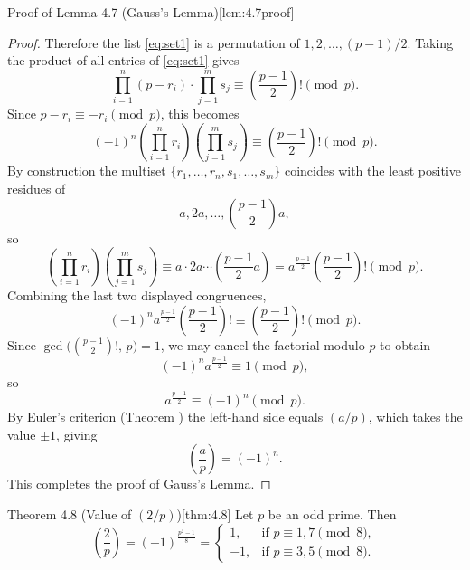 \documentclass[10pt]{article}
\theoremstyle{definition}
\theoremstyle{plain}
\numberwithin{equation}{section}
\begin{document}
\begin{define}{Proof of Lemma 4.7 (Gauss's Lemma)}[lem:4.7proof]
\begin{proof}
Therefore the list \eqref{eq:set1} is a permutation of $1,2,\dots,(p-1)/2$. Taking the product of all entries of \eqref{eq:set1} gives
\[
\prod_{i=1}^n (p-r_i)\cdot\prod_{j=1}^m s_j \equiv \left(\frac{p-1}{2}\right)! \pmod p.
\]
Since $p-r_i \equiv -r_i\pmod p$, this becomes
\[
(-1)^n \left(\prod_{i=1}^n r_i\right)\left(\prod_{j=1}^m s_j\right) \equiv \left(\frac{p-1}{2}\right)! \pmod p.
\]
By construction the multiset $\{r_1,\dots,r_n,s_1,\dots,s_m\}$ coincides with the least positive residues of
\[
a,2a,\dots,\left(\frac{p-1}{2}\right)a,
\]
so
\[
\left(\prod_{i=1}^n r_i\right)\left(\prod_{j=1}^m s_j\right)\equiv a\cdot 2a\cdots\left(\frac{p-1}{2}a\right)
= a^{\frac{p-1}{2}}\left(\frac{p-1}{2}\right)! \pmod p.
\]
Combining the last two displayed congruences,
\[
(-1)^n a^{\frac{p-1}{2}}\left(\frac{p-1}{2}\right)! \equiv \left(\frac{p-1}{2}\right)! \pmod p.
\]
Since $\gcd\!\big((\tfrac{p-1}{2})!,\,p\big)=1$, we may cancel the factorial modulo $p$ to obtain
\[
(-1)^n a^{\frac{p-1}{2}} \equiv 1 \pmod p,
\]
so
\[
a^{\frac{p-1}{2}} \equiv (-1)^n \pmod p.
\]
By Euler's criterion (Theorem ) the left-hand side equals $(a/p)$, which takes the value $\pm1$, giving
\[
\left(\frac{a}{p}\right)=(-1)^n.
\]
This completes the proof of Gauss's Lemma.
\end{proof}
\end{define}

\bigskip

\begin{define}{Theorem 4.8 (Value of $(2/p)$)}[thm:4.8]
Let $p$ be an odd prime. Then
\[
\left(\frac{2}{p}\right)=(-1)^{\frac{p^2-1}{8}}=
\begin{cases}
1, & \text{if } p\equiv 1,7\pmod 8,\\[4pt]
-1,& \text{if } p\equiv 3,5\pmod 8.
\end{cases}
\]
\end{define}
\end{document}

